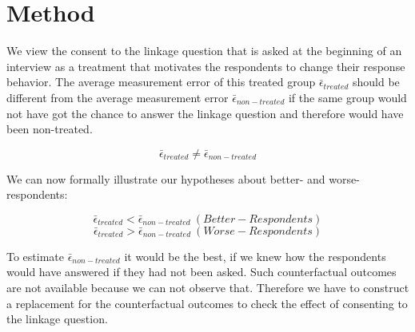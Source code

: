 
\section{Method}\label{method}

We view the consent to the linkage question that is asked at the beginning of an interview as a treatment that motivates the respondents to change their response behavior. The average measurement error of this treated group \(\bar{\epsilon}_{treated}\) should be different from the average measurement error \(\bar{\epsilon}_{non-treated}\) if the same group would not have got the chance to answer the linkage question and therefore would have been non-treated.

\begin{equation}
\bar{\epsilon}_{treated} \neq \bar{\epsilon}_{non-treated}
\label{eq:hyp_epsi}
\end{equation}

We can now formally illustrate our hypotheses about better- and worse-respondents:

\begin{equation}
\bar{\epsilon}_{treated} < \bar{\epsilon}_{non-treated} \ (Better-Respondents)
\label{eq:hyp_better}
\end{equation}
\begin{equation}
\bar{\epsilon}_{treated} > \bar{\epsilon}_{non-treated}  \ (Worse-Respondents)
\label{eq:hyp_worse}
\end{equation}

To estimate \(\bar{\epsilon}_{non-treated}\) it would be the best, if we knew how the respondents would have answered if they had not been asked. Such counterfactual outcomes are not available because we can not observe that. Therefore we have to construct a replacement for the counterfactual outcomes to check the effect of consenting to the linkage question.

